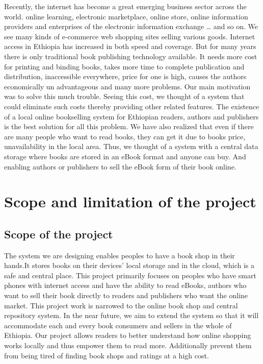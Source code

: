 Recently, the internet has become a great emerging business sector across the world. online learning, electronic marketplace, online store, online information providers and enterprises of the electronic information exchange … and so on. We see many kinds of e-commerce web shopping sites selling various goods. Internet access in Ethiopia has increased in both speed and coverage. But for many years there is only traditional book publishing technology available. It needs more cost for printing and binding books, takes more time to complete publication and distribution, inaccessible everywhere, price for one is high, causes the authors economically un advantageous and many more problems. Our main motivation was to solve this much trouble. Seeing this cost, we thought of a system that could eliminate such costs thereby providing other related features. The existence of a local online bookselling system for Ethiopian readers, authors and publishers is the best solution for all this problem. We have also realized that even if there are many people who want to read books, they can get it due to books price, unavailability in the local area. Thus, we thought of a system with a central data storage where books are stored in an eBook format and anyone can buy. And enabling authors or publishers to sell the eBook form of their book online.

	\section{Scope and limitation of the project}
		\subsection{Scope of the project}

The system we are designing enables peoples to have a book shop in their hands.It stores books on their devices' local storage and in the cloud, which is a safe and central place. This project primarily focuses on peoples who have smart phones with internet access and have the ability to read eBooks, authors who want to sell their book directly to readers and publishers who want the online market. This project work is narrowed to the online book shop and central repository system. In the near future, we aim to extend the system so that it will accommodate each and every book consumers and sellers in the whole of Ethiopia. Our project allows readers to better understand how online shopping works locally and thus empower them to read more. Additionally prevent them from being tired of finding book shops and ratings at a high cost.

